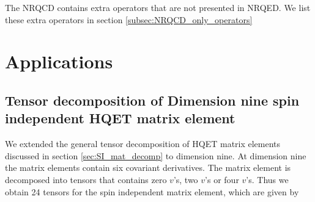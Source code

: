 The NRQCD contains extra operators that are not presented in NRQED. We list these extra operators in section \ref{subsec:NRQCD_only_operators}
\section{Applications}\label{applications}
\subsection{Tensor decomposition of Dimension nine spin independent HQET matrix element }
We extended the general tensor decomposition of HQET matrix elements discussed in section \ref{sec:SI_mat_decomp} to dimension nine. At dimension nine the matrix elements contain six covariant derivatives. The matrix element is decomposed into tensors that contains zero $v$'s, two $v$'s or four $v$'s. Thus we obtain 24 tensors for the spin independent matrix element, which are given by

